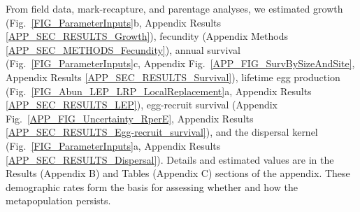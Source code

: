\documentclass[12pt, oneside]{article}   	%
\begin{document}

From field data, mark-recapture, and parentage analyses, we estimated growth (Fig.\ \ref{FIG_ParameterInputs}b, Appendix Results \ref{APP_SEC_RESULTS_Growth}), fecundity (Appendix Methods \ref{APP_SEC_METHODS_Fecundity}), annual survival (Fig.\ \ref{FIG_ParameterInputs}c, Appendix Fig.\ \ref{APP_FIG_SurvBySizeAndSite}, Appendix Results \ref{APP_SEC_RESULTS_Survival}), lifetime egg production (Fig.\ \ref{FIG_Abun_LEP_LRP_LocalReplacement}a, Appendix Results \ref{APP_SEC_RESULTS_LEP}), egg-recruit survival (Appendix Fig.\ \ref{APP_FIG_Uncertainty_RperE}, Appendix Results \ref{APP_SEC_RESULTS_Egg-recruit_survival}), and the dispersal kernel (Fig.\ \ref{FIG_ParameterInputs}a, Appendix Results \ref{APP_SEC_RESULTS_Dispersal}). Details and estimated values are in the Results (Appendix B) and Tables (Appendix C) sections of the appendix. These demographic rates form the basis for assessing whether and how the metapopulation persists.

\end{document}
